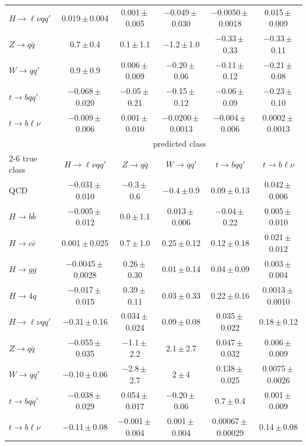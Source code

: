\begin{landscape}
{\begin{center}
\begin{minipage}{\linewidth}
\begin{tabular*}{\linewidth}{@{\extracolsep{\fill}}lccccc@{}}
$H\to \ell\nu qq'$ & 0.019\,$\pm$\,0.004 & 0.001\,$\pm$\,0.005 & $-$0.049\,$\pm$\,0.030 & $-$0.0050\,$\pm$\,0.0018 & 0.015\,$\pm$\,0.009 \\
$Z\to q\bar q$ & 0.7\,$\pm$\,0.4 & 0.1\,$\pm$\,1.1 & $-$1.2\,$\pm$\,1.0 & $-$0.33\,$\pm$\,0.33 & $-$0.33\,$\pm$\,0.11 \\
$W\to qq'$ & 0.9\,$\pm$\,0.9 & 0.006\,$\pm$\,0.009 & $-$0.20\,$\pm$\,0.06 & $-$0.11\,$\pm$\,0.12 & $-$0.21\,$\pm$\,0.08 \\
$t\to bqq'$ & $-$0.068\,$\pm$\,0.020 & $-$0.05\,$\pm$\,0.21 & $-$0.15\,$\pm$\,0.12 & $-$0.06\,$\pm$\,0.09 & $-$0.23\,$\pm$\,0.10 \\
$t\to b\ell\nu$ & $-$0.009\,$\pm$\,0.006 & 0.001\,$\pm$\,0.010 & $-$0.0200\,$\pm$\,0.0013 & $-$0.004\,$\pm$\,0.006 & 0.0002\,$\pm$\,0.0013 \\
\midrule
 & \multicolumn{5}{c}{predicted class} \\
\cmidrule(lr){2-6}
true class & $H\to \ell\nu qq'$ & $Z\to q\bar q$ & $W\to qq'$ & $t\to bqq'$ & $t\to b\ell\nu$ \\
\midrule
QCD & $-$0.031\,$\pm$\,0.010 & $-$0.3\,$\pm$\,0.6 & $-$0.4\,$\pm$\,0.9 & 0.09\,$\pm$\,0.13 & 0.042\,$\pm$\,0.006 \\
$H\to b\bar b$ & $-$0.005\,$\pm$\,0.012 & 0.0\,$\pm$\,1.1 & 0.013\,$\pm$\,0.006 & $-$0.04\,$\pm$\,0.22 & 0.005\,$\pm$\,0.010 \\
$H\to c\bar c$ & 0.001\,$\pm$\,0.025 & 0.7\,$\pm$\,1.0 & 0.25\,$\pm$\,0.12 & 0.12\,$\pm$\,0.18 & 0.021\,$\pm$\,0.012 \\
$H\to gg$ & $-$0.0045\,$\pm$\,0.0028 & 0.26\,$\pm$\,0.30 & 0.01\,$\pm$\,0.14 & 0.04\,$\pm$\,0.09 & 0.003\,$\pm$\,0.004 \\
$H\to 4q$ & $-$0.017\,$\pm$\,0.015 & 0.39\,$\pm$\,0.11 & 0.03\,$\pm$\,0.33 & 0.22\,$\pm$\,0.16 & 0.0013\,$\pm$\,0.0010 \\
$H\to \ell\nu qq'$ & $-$0.31\,$\pm$\,0.16 & 0.034\,$\pm$\,0.024 & 0.09\,$\pm$\,0.08 & 0.035\,$\pm$\,0.022 & 0.18\,$\pm$\,0.12 \\
$Z\to q\bar q$ & $-$0.055\,$\pm$\,0.035 & $-$1.1\,$\pm$\,2.2 & 2.1\,$\pm$\,2.7 & 0.047\,$\pm$\,0.032 & 0.006\,$\pm$\,0.009 \\
$W\to qq'$ & $-$0.10\,$\pm$\,0.06 & $-$2.8\,$\pm$\,2.7 & 2\,$\pm$\,4 & 0.138\,$\pm$\,0.025 & 0.0075\,$\pm$\,0.0026 \\
$t\to bqq'$ & $-$0.038\,$\pm$\,0.029 & 0.054\,$\pm$\,0.017 & $-$0.20\,$\pm$\,0.06 & 0.7\,$\pm$\,0.4 & 0.001\,$\pm$\,0.009 \\
$t\to b\ell\nu$ & $-$0.11\,$\pm$\,0.08 & $-$0.001\,$\pm$\,0.004 & 0.001\,$\pm$\,0.004 & 0.00067\,$\pm$\,0.00029 & 0.14\,$\pm$\,0.08 \\

\end{tabular*}
\end{minipage}
\end{center}}
\end{landscape}
